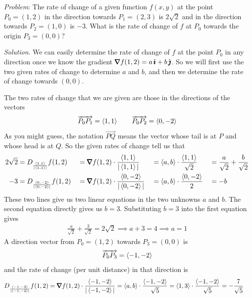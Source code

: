 \begin{eg}\label{eg dir deriv E}
\noindent\textit{Problem}:
The rate of change of a given function $f(x,y)$ at the point $P_0=(1,2)$
in the direction towards $P_1=(2,3)$ is $2\sqrt{2}$ and in the direction 
towards $P_2=(1,0)$ is $-3$. What is the rate of change of $f$ at $P_0$ 
towards the origin $P_3=(0,0)$?

\medskip
\noindent\textit{Solution}. 
We can easily determine the rate of change of $f$ at the point $P_0$
in any direction once we know the gradient $\vnabla f(1,2) =a\,\hi+b\,\hj$.
So we will first use the two given rates of change to determine $a$ and $b$,
and then we determine the rate of change towards $(0,0)$.

The two rates of change that we are given are those in the directions 
of the vectors
\begin{align*}
\overrightarrow{P_0P_1} = \left< 1,1\right> \qquad
\overrightarrow{P_0P_2} = \left< 0,-2\right> 
\end{align*}
As you might guess, the notation $\overrightarrow{PQ}$ means the
vector whose tail is at $P$ and whose head is at $Q$.
So the given rates of change tell us that
\begin{alignat*}{5}
2\sqrt{2}&=D_{\frac{\llt 1,1\rgt}{|\llt 1,1\rgt|}} f(1,2) 
   &&= \vnabla f(1,2)\cdot\frac{\llt 1,1\rgt}{|\llt 1,1\rgt|}
   &&= \llt a,b\rgt\cdot\frac{\llt 1,1\rgt}{\sqrt{2}}
   &&=\frac{a}{\sqrt{2}} +\frac{b}{\sqrt{2}} \\
-3&=D_{\frac{\llt 0,-2\rgt}{|\llt 0,-2\rgt|}} f(1,2) 
   &&= \vnabla f(1,2)\cdot\frac{\llt 0,-2\rgt}{|\llt 0,-2\rgt|}
   &&= \llt a,b\rgt\cdot\frac{\llt 0,-2\rgt}{2}
   &&=-b 
\end{alignat*}
These two lines give us two linear equations in the two unknowns $a$ and $b$. 
The second equation directly gives us $b=3$. Substituting $b=3$ into 
the first equation gives
\begin{align*}
\frac{a}{\sqrt{2}} +\frac{3}{\sqrt{2}} = 2\sqrt{2} \implies
a+3=4 \implies
a=1
\end{align*}
A direction vector from $P_0=(1,2)$ towards $P_3=(0,0)$ is
\begin{equation*}
\overrightarrow{P_0P_3} = \left< -1,-2\right>
\end{equation*}
and the rate of change (per unit distance) in that direction is
\begin{align*}
D_{\frac{\llt -1,-2\rgt}{|\llt -1,-2\rgt|}} f(1,2) 
   &= \vnabla f(1,2)\cdot\frac{\llt -1,-2\rgt}{|\llt -1,-2\rgt|}
    = \llt a,b\rgt\cdot\frac{\llt -1,-2\rgt}{\sqrt{5}}
    = \llt 1,3\rgt\cdot\frac{\llt -1,-2\rgt}{\sqrt{5}}
=-\frac{7}{\sqrt{5}}
\end{align*}
\end{eg}

